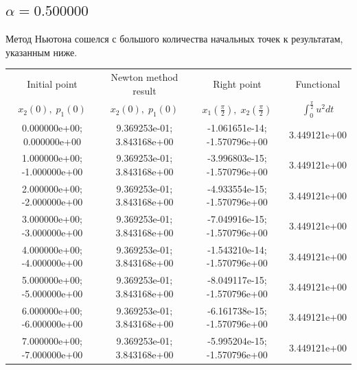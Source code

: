 \documentclass[titlepage]{article}
\def\l{\left}
\def\r{\right}
\begin{document}
\subsection{$\alpha = 0.500000$} 
Метод Ньютона сошелся с большого количества начальных точек к результатам, указанным ниже. \\ 
\begin{tabular}{ | c | c | c | c |} 
\hline 
Initial point  & Newton method result & Right point & Functional 
 \\ $x_2(0), \; p_1(0)$ & $x_2(0), \; p_1(0)$ & $x_1\l(\frac{\pi}{2}\r), \; x_2\l(\frac{\pi}{2}\r)$ & $\int_{0}^{\frac{\pi}{2}}u^2dt$  \\ \hline 
0.000000e+00; 0.000000e+00 & 9.369253e-01; 3.843168e+00 & -1.061651e-14; -1.570796e+00 & 3.449121e+00 \\ \hline 
1.000000e+00; -1.000000e+00 & 9.369253e-01; 3.843168e+00 & -3.996803e-15; -1.570796e+00 & 3.449121e+00 \\ \hline 
2.000000e+00; -2.000000e+00 & 9.369253e-01; 3.843168e+00 & -4.933554e-15; -1.570796e+00 & 3.449121e+00 \\ \hline 
3.000000e+00; -3.000000e+00 & 9.369253e-01; 3.843168e+00 & -7.049916e-15; -1.570796e+00 & 3.449121e+00 \\ \hline 
4.000000e+00; -4.000000e+00 & 9.369253e-01; 3.843168e+00 & -1.543210e-14; -1.570796e+00 & 3.449121e+00 \\ \hline 
5.000000e+00; -5.000000e+00 & 9.369253e-01; 3.843168e+00 & -8.049117e-15; -1.570796e+00 & 3.449121e+00 \\ \hline 
6.000000e+00; -6.000000e+00 & 9.369253e-01; 3.843168e+00 & -6.161738e-15; -1.570796e+00 & 3.449121e+00 \\ \hline 
7.000000e+00; -7.000000e+00 & 9.369253e-01; 3.843168e+00 & -5.995204e-15; -1.570796e+00 & 3.449121e+00 \\ \hline 
\end{tabular} 
\end{document}
